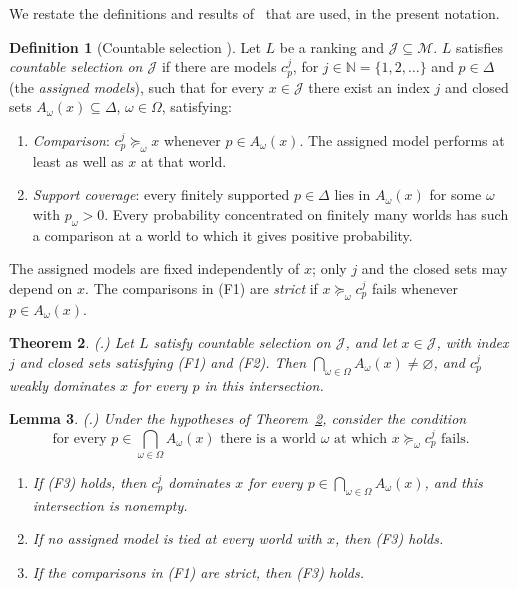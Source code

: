 \documentclass[11pt]{article}
\newtheorem{theorem}{Theorem}[section]
\newtheorem{lemma}[theorem]{Lemma}
\theoremstyle{definition}
\newtheorem{definition}[theorem]{Definition}
\newcommand{\M}{\mathcal M}
\newcommand{\J}{\mathcal J}
\begin{document}
{\color{red}We restate the definitions and results of~\cite{LDG} that are used, in the present notation.}

\begin{definition}[Countable selection {\cite{LDG}}]\label{def:selection}
Let $L$ be a ranking and $\J\subseteq\M$. $L$ satisfies \emph{countable selection on $\J$} if there are models $c^j_p$, for $j\in\mathbb N=\{1,2,\ldots\}$ and $p\in\Delta$ (the \emph{assigned models}), such that for every $x\in\J$ there exist an index $j$ and closed sets $A_\omega(x)\subseteq\Delta$, $\omega\in\Omega$, satisfying:
\begin{enumerate}[label=\textbf{(F\arabic*)},leftmargin=3.2em]
\item \emph{Comparison}: $c^j_p\succeq_\omega x$ whenever $p\in A_\omega(x)$. The assigned model performs at least as well as $x$ at that world.
\item \emph{Support coverage}: every finitely supported $p\in\Delta$ lies in $A_\omega(x)$ for some $\omega$ with $p_\omega>0$. Every probability concentrated on finitely many worlds has such a comparison at a world to which it gives positive probability.
\end{enumerate}
The assigned models are fixed independently of $x$; only $j$ and the closed sets may depend on $x$. {\color{red}The comparisons in (F1) are \emph{strict} if $x\succeq_\omega c^j_p$ fails whenever $p\in A_\omega(x)$.}
\end{definition}

\begin{theorem}\label{thm:LDGgeneral}
\emph{(\cite[Theorem~3.5]{LDG}.)} Let $L$ satisfy countable selection on $\J$, and let $x\in\J$, with index $j$ and closed sets satisfying (F1) and (F2). Then $\bigcap_{\omega\in\Omega}A_\omega(x)\ne\varnothing$, and $c^j_p$ weakly dominates $x$ for every $p$ in this intersection.
\end{theorem}

\begingroup\color{red}
\begin{lemma}\label{lem:LDGnotie}
\emph{(\cite[Lemma~3.7]{LDG}.)} Under the hypotheses of Theorem~\ref{thm:LDGgeneral}, consider the condition
\begin{equation}
\text{for every }p\in\textstyle\bigcap_{\omega\in\Omega}A_\omega(x)\text{ there is a world }\omega\text{ at which }x\succeq_\omega c^j_p\text{ fails.}\tag{F3}\label{eq:F3}
\end{equation}
\begin{enumerate}[label=(\alph*)]
\item If (F3) holds, then $c^j_p$ dominates $x$ for every $p\in\bigcap_{\omega\in\Omega}A_\omega(x)$, and this intersection is nonempty.
\item If no assigned model is tied at every world with $x$, then (F3) holds.
\item If the comparisons in (F1) are strict, then (F3) holds.
\end{enumerate}
\end{lemma}
\endgroup
\end{document}
